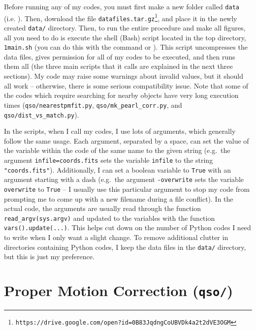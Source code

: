 \documentclass{article}
\begin{document}
Before running any of my codes, you must first make a new folder called \texttt{data} (i.e. ). Then, download the file \texttt{datafiles.tar.gz}\footnote{\texttt{https://drive.google.com/open?id=0B83JqdngCoUBVDk4a2t2dVE3OGM}}, and place it in the newly created \texttt{data/} directory. Then, to run the entire procedure and make all figures, all you need to do is execute the shell (Bash) script located in the top directory, \texttt{1main.sh} (you can do this with the command  or ). This script uncompresses the data files, gives permission for all of my codes to be executed, and then runs them all (the three main scripts that it calls are explained in the next three sections). My code may raise some warnings about invalid values, but it should all work -- otherwise, there is some serious compatibility issue. Note that some of the codes which require searching for nearby objects have very long execution times (\texttt{qso/nearestpmfit.py}, \texttt{qso/mk\_pearl\_corr.py}, and \texttt{qso/dist\_vs\_match.py}).

In the scripts, when I call my codes, I use lots of arguments, which generally follow the same usage. Each argument, separated by a space, can set the value of the variable within the code of the same name to the given string (e.g.\ the argument \texttt{infile=coords.fits} sets the variable \texttt{infile} to the string \texttt{"coords.fits"}). Additionally, I can set a boolean variable to \texttt{True} with an argument starting with a dash (e.g.\ the argument \texttt{-overwrite} sets the variable \texttt{overwrite} to \texttt{True} -- I usually use this particular argument to stop my code from prompting me to come up with a new filename during a file conflict). In the actual code, the arguments are usually read through the function \texttt{read\_argv(sys.argv)} and updated to the variables with the function \texttt{vars().update(...)}. This helps cut down on the number of Python codes I need to write when I only want a slight change. To remove additional clutter in directories containing Python codes, I keep the data files in the \texttt{data/} directory, but this is just my preference.

\section{Proper Motion Correction (\texttt{qso/})} \label{sec:qso}
\end{document}
